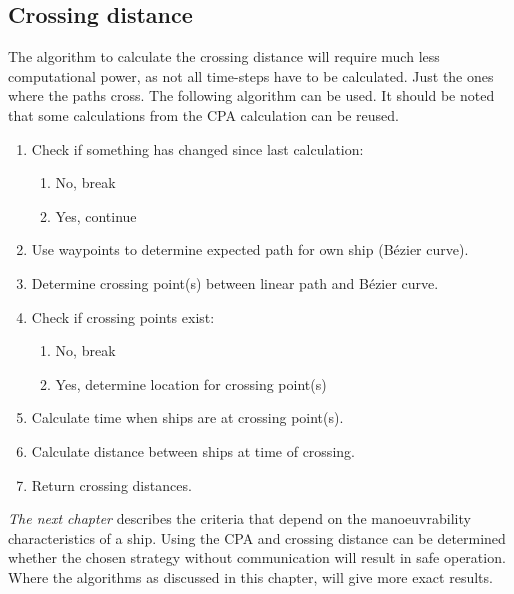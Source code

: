 \subsection{Crossing distance}
The algorithm to calculate the crossing distance will require much less computational power, as not all time-steps have to be calculated. Just the ones where the paths cross. The following algorithm can be used. It should be noted that some calculations from the CPA calculation can be reused.
\begin{enumerate}
	\item Check if something has changed since last calculation:
	\begin{enumerate}
		\item No, break
		\item Yes, continue
	\end{enumerate}
	\item Use waypoints to determine expected path for own ship (Bézier curve).
	\item Determine crossing point(s) between linear path and Bézier curve.
	\item Check if crossing points exist:
	\begin{enumerate}
		\item No, break
		\item Yes, determine location for crossing point(s)
	\end{enumerate}
	\item Calculate time when ships are at crossing point(s).
	\item Calculate distance between ships at time of crossing.
	\item Return crossing distances.
\end{enumerate}

\vspace{1.5cm}
\emph{The next chapter} describes the criteria that depend on the manoeuvrability characteristics of a ship. Using the \ac{CPA} and crossing distance can be determined whether the chosen strategy without communication will result in safe operation. Where the algorithms as discussed in this chapter, will give more exact results.

